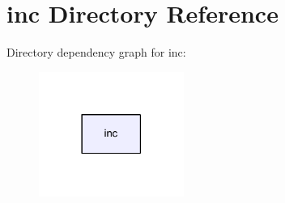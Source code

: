 \section{inc Directory Reference}
\label{dir_bfccd401955b95cf8c75461437045ac0}
Directory dependency graph for inc\+:
\nopagebreak
\begin{figure}[H]
\begin{center}
\leavevmode
\includegraphics[width=134pt]{dir_bfccd401955b95cf8c75461437045ac0_dep}
\end{center}
\end{figure}
